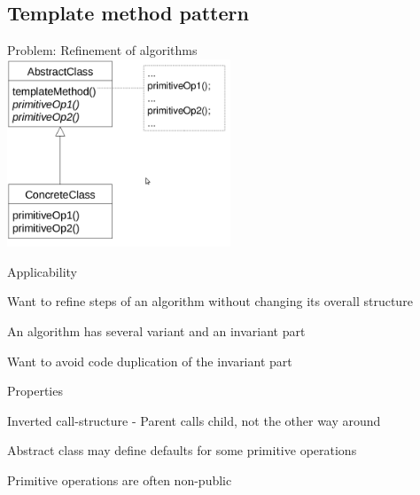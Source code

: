 \documentclass[10pt]{article}
\begin{document}
\subsection{Template method pattern}
\enumstart
	\item Problem: Refinement of algorithms
	\\ \includegraphics[width=0.5\textwidth]{template_method_pattern.png}
	\item Applicability
	\enumstart
		\item Want to refine steps of an algorithm without changing its overall structure
		\item An algorithm has several variant and an invariant part
		\item Want to avoid code duplication of the invariant part
	\enumend
	\item Properties
	\enumstart
		\item Inverted call-structure - Parent calls child, not the other way around
		\item Abstract class may define defaults for some primitive operations
		\item Primitive operations are often non-public
	\enumend
\enumend
\end{document}
